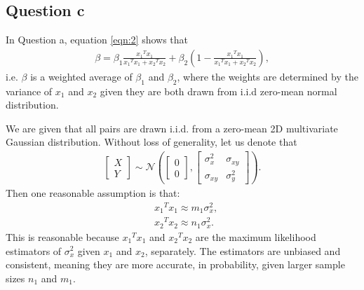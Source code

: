 \documentclass[12pt]{article}
\newcommand{\n}{n}
\newcommand{\nln}[1]{\n_{1}}
\newcommand{\m}{m}
\newcommand{\mln}[1]{\m_{1}}
\newcommand{\x}{x}
\newcommand{\xln}[1]{x_{#1}}
\newcommand{\tran}[1]{{#1}^{T}}
\newcommand{\bet}{\beta}
\newcommand{\betln}[1]{\bet_{#1}}
\newcommand{\mean}[1]{ \bar{#1} }
\begin{document}

\subsection{Question c}

In Question a, equation \eqref{eqn:2} shows that
\begin{align*}
	\bet = \betln{1} \frac{\tran{\xln{1}}\xln{1}}{\tran{\xln{1}}\xln{1} + \tran{\xln{2}}\xln{2}} +  \betln{2} \left(1 - \frac{\tran{\xln{1}}\xln{1}}{\tran{\xln{1}}\xln{1} + \tran{\xln{2}}\xln{2}} \right),
\end{align*}
i.e. $\beta$ is a weighted average of $\betln{1}$ and $\betln{2}$,
where the weights are determined by the variance of $\xln{1}$
and $\xln{2}$ given they are both drawn from i.i.d zero-mean
normal distribution.

We are given that all pairs are drawn i.i.d. from a zero-mean 2D multivariate Gaussian distribution. Without loss of generality, let us denote that 
\begin{align*}
	\begin{bmatrix} X \\ Y \end{bmatrix} \sim \mathcal{N} \left(
	\begin{bmatrix} 0 \\ 0 \end{bmatrix},
	\begin{bmatrix} \sigma_x^2 & \sigma_{xy} \\ \sigma_{xy} & \sigma_y^2 \end{bmatrix}
	\right).
\end{align*}
Then one reasonable assumption is that:
\begin{align*}
	&\tran{\xln{1}}\xln{1} \approx \mln{1}\sigma_x^2, \\
	&\tran{\xln{2}}\xln{2} \approx \nln{1}\sigma_x^2.
\end{align*}
This is reasonable because $\tran{\xln{1}}\xln{1}$ and $\tran{\xln{2}}\xln{2}$
are the maximum likelihood estimators of $\sigma_x^2$ given $\xln{1}$
and $\xln{2}$, separately. The estimators are unbiased and consistent,
meaning they are more accurate, in probability, given larger sample
sizes $\nln{1}$ and $\mln{1}$.
\end{document}

